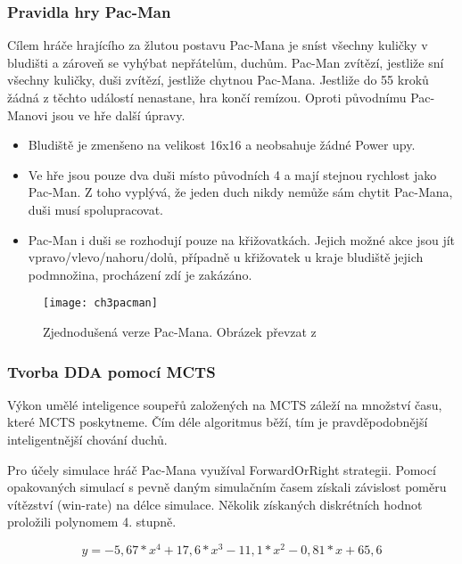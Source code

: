 \subsubsection{Pravidla hry Pac-Man}

Cílem hráče hrajícího za žlutou postavu Pac-Mana je sníst všechny kuličky v bludišti a zároveň se vyhýbat nepřátelům, duchům. Pac-Man zvítězí, jestliže sní všechny kuličky, duši zvítězí, jestliže chytnou Pac-Mana. Jestliže do 55 kroků žádná z těchto událostí nenastane, hra končí remízou. Oproti původnímu Pac-Manovi jsou ve hře další úpravy.


\begin{itemize}
	\item Bludiště je zmenšeno na velikost 16x16 a neobsahuje žádné Power upy.
	\item Ve hře jsou pouze dva duši místo původních 4 a mají stejnou rychlost jako Pac-Man. Z toho vyplývá, že jeden duch nikdy nemůže sám chytit Pac-Mana, duši musí spolupracovat.
	\item Pac-Man i duši se rozhodují pouze na křižovatkách. Jejich možné akce jsou jít vpravo/vlevo/nahoru/dolů, případně u křižovatek u kraje bludiště jejich podmnožina, procházení zdí je zakázáno.
\end{itemize}

\begin{figure}
  \centering
  \texttt{[image: ch3pacman]}
	\caption{Zjednodušená verze Pac-Mana. Obrázek převzat z \cite{18Pac1}}
	\label{fig:ch3pacman}
\end{figure}

\subsubsection{Tvorba DDA pomocí MCTS}

Výkon umělé inteligence soupeřů založených na MCTS záleží na množství času, které MCTS poskytneme. Čím déle algoritmus běží, tím je pravděpodobnější inteligentnější chování duchů.

Pro účely simulace hráč Pac-Mana využíval ForwardOrRight strategii.
Pomocí opakovaných simulací s pevně daným simulačním časem získali závislost poměru vítězství (win-rate) na délce simulace. Několik získaných diskrétních hodnot proložili polynomem 4. stupně.

\begin{equation}
	y=-5,67*x^4+17,6*x^3-11,1*x^2-0,81*x+65,6
\end{equation}

